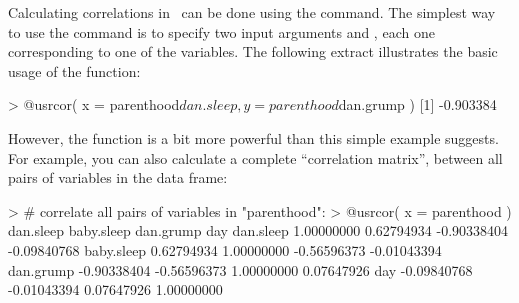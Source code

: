 


Calculating correlations in \R\ can be done using the  command. The simplest way to use the command is to specify two input arguments  and , each one corresponding to one of the variables. The following extract illustrates the basic usage of the function:
\begin{rblock1}
> @usr{cor( x = parenthood$dan.sleep, y = parenthood$dan.grump )}
[1] -0.903384
\end{rblock1}
However, the  function is a bit more powerful than this simple example suggests. For example, you can also calculate a complete ``correlation matrix'', between all pairs of variables in the data frame:
\begin{rblock1}
> # correlate all pairs of variables in "parenthood":
> @usr{cor( x = parenthood )}  
             dan.sleep  baby.sleep   dan.grump         day
dan.sleep   1.00000000  0.62794934 -0.90338404 -0.09840768
baby.sleep  0.62794934  1.00000000 -0.56596373 -0.01043394
dan.grump  -0.90338404 -0.56596373  1.00000000  0.07647926
day        -0.09840768 -0.01043394  0.07647926  1.00000000
\end{rblock1}



 
